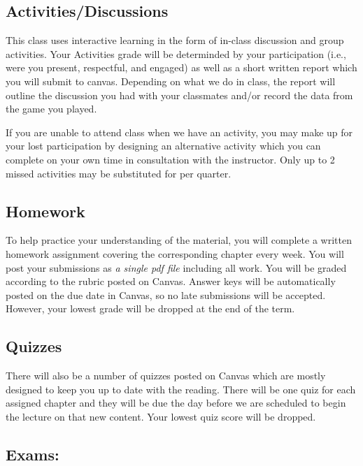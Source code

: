 \hypertarget{grade:activity}{\subsection{Activities/Discussions}}

This class uses interactive learning in the form of in-class discussion and group activities.
Your Activities grade will be determinded by your participation (i.e., were you present, respectful, and engaged)
as well as a short written report which you will submit to canvas.
Depending on what we do in class, the report will outline the discussion you had with your classmates
and/or record the data from the game you played.

If you are unable to attend class when we have an activity, you may make up for your lost participation by designing an alternative activity which you can complete on your own time in consultation with the instructor.
Only up to 2 missed activities may be substituted for per quarter.

\hypertarget{grade:HW}{\subsection{Homework}}

To help practice your understanding of the material, you will complete a written homework assignment covering the corresponding chapter every week.
You will post your submissions as \textit{a single pdf file} including all work. You will be graded according to the rubric posted on Canvas. 
Answer keys will be automatically posted on the due date in Canvas, so no late submissions will be accepted.
However, your lowest grade will be dropped at the end of the term.

\hypertarget{grade:quiz}{\subsection{Quizzes}}

There will also be a number of quizzes posted on Canvas which are mostly designed to keep you up to date with the reading.
There will be one quiz for each assigned chapter and they will be due the day before we are scheduled to begin the lecture on that new content.
Your lowest quiz score will be dropped.
 
\hypertarget{grade:exam}{\subsection{Exams:}}

